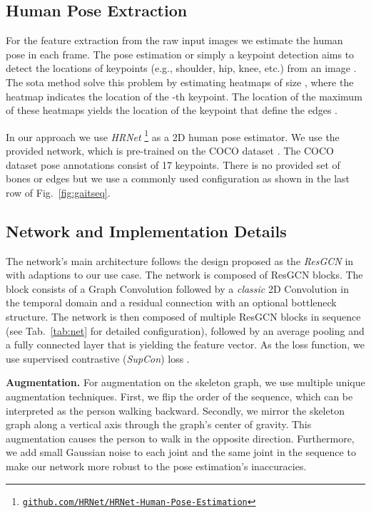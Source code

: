 \documentclass{article}
\newcommand{\nparagraph}[1]{\noindent\textbf{#1.  }}
\begin{document}
\subsection{Human Pose Extraction}
For the feature extraction from the raw input images we estimate the human pose in each frame.
The pose estimation or simply a keypoint detection aims to detect the locations of  keypoints (e.g., shoulder, hip, knee, etc.) from an image . The \gls{sota} method \cite{cheng2020bottom} solve this problem by estimating  heatmaps  of size , where the heatmap  indicates the location of the -th keypoint. The location of the maximum of these heatmaps  yields the location of the keypoint  that define the edges .

In our approach we use \textit{HRNet} \cite{sun2019deep}\footnote{\href{https://github.com/HRNet/HRNet-Human-Pose-Estimation}{\tt github.com/HRNet/HRNet-Human-Pose-Estimation}} as a 2D human pose estimator. We use the provided network, which is pre-trained  on the COCO dataset \cite{lin2014microsoft}. The COCO dataset pose annotations consist of 17 keypoints. There is no provided set of bones or edges  but we use a commonly used configuration as shown in the last row of Fig.~\ref{fig:gaitseq}. 

\subsection{Network and Implementation Details}
The network's main architecture follows the design proposed as the \textit{ResGCN} in \cite{song2020stronger} with adaptions to our use case. The network is composed of ResGCN blocks. The block consists of a Graph Convolution followed by a \textit{classic} 2D Convolution in the temporal domain and a residual connection with an optional bottleneck structure. The network is then composed of multiple ResGCN blocks in sequence (see Tab.~\ref{tab:net} for detailed configuration), followed by an average pooling and a fully connected layer that is yielding the feature vector. As the loss function, we use supervised contrastive (\textit{SupCon}) loss \cite{khosla2020supervised}.

\nparagraph{Augmentation} For augmentation on the skeleton graph, we use multiple unique augmentation techniques. First, we flip the order of the sequence, which can be interpreted as the person walking backward. Secondly, we mirror the skeleton graph along a vertical axis through the graph's center of gravity. This augmentation causes the person to walk in the opposite direction. Furthermore, we add small Gaussian noise to each joint and the same joint in the sequence to make our network more robust to the pose estimation's inaccuracies.
\end{document}

